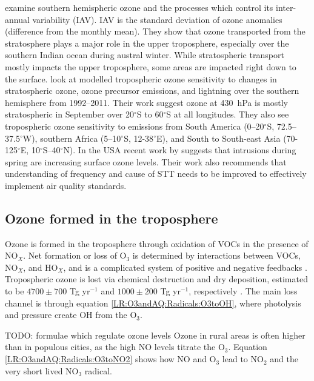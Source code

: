     \cite{Liu2017} examine southern hemispheric ozone and the processes which control its inter-annual variability (IAV).
    IAV is the standard deviation of ozone anomalies (difference from the monthly mean).
    They show that ozone transported from the stratosphere plays a major role in the upper troposphere, especially over the southern Indian ocean during austral winter.
    While stratospheric transport mostly impacts the upper troposphere, some areas are impacted right down to the surface.
    \citet{Liu2017} look at modelled tropospheric ozone sensitivity to changes in stratospheric ozone, ozone precursor emissions, and lightning over the southern hemisphere from 1992--2011. 
    Their work suggest ozone at 430~hPa is mostly stratospheric in September over 20$^{\circ}$S to 60$^{\circ}$S at all longitudes.
    They also see tropospheric ozone sensitivity to emissions from South America (0--20$^{\circ}$S, 72.5--37.5$^{\circ}$W), southern Africa (5--10$^{\circ}$S, 12-38$^{\circ}$E), and South to South-east Asia (70-125$^{\circ}$E, 10$^{\circ}$S--40$^{\circ}$N).
    In the USA recent work by \cite{Lin2015} suggests that intrusions during spring are increasing surface ozone levels.
    Their work also recommends that understanding of frequency and cause of STT needs to be improved to effectively implement air quality standards.
  

  \subsection{Ozone formed in the troposphere}
    \label{LR:O3andAQ:BiogenicOzonePrecursors}
    
    Ozone is formed in the troposphere through oxidation of VOCs in the presence of NO$_X$.
    Net formation or loss of O$_3$ is determined by interactions between VOCs, NO$_X$, and HO$_X$, and is a complicated system of positive and negative feedbacks \citep{Atkinson2000}.
    Tropospheric ozone is lost via chemical destruction and dry deposition, estimated to be $4700\pm700$ Tg yr$^{-1}$ and $1000\pm200$ Tg yr$^{-1}$, respectively \citep{Stevenson2006}.
    The main loss channel is through equation \ref{LR:O3andAQ:Radicals:O3toOH}, where photolysis and pressure create OH from the O$_3$.
    
    TODO: formulae which regulate ozone levels
    Ozone in rural areas is often higher than in populous cities, as the high NO levels titrate the O$_3$.
    Equation \ref{LR:O3andAQ:Radicals:O3toNO2} shows how NO and O$_3$ lead to NO$_2$ and the very short lived NO$_3$ radical.
    
